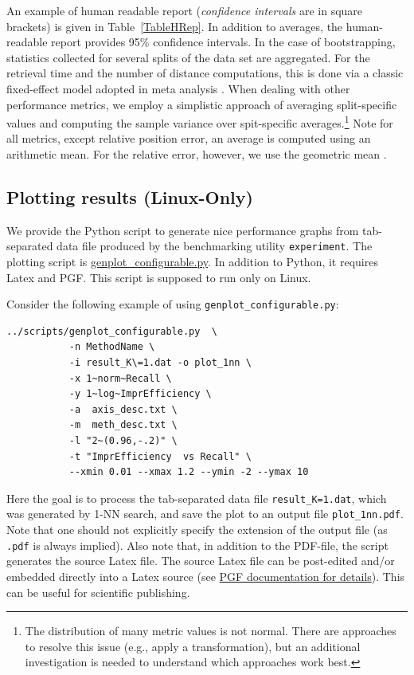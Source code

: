 \documentclass[runningheads,a4paper]{llncs}
\newcommand{\replocfile}{https://github.com/searchivarius/NonMetricSpaceLib/blob/pserv/}
\newcommand{\ttt}[1]{\texttt{#1}}
\begin{document}
{An example of human readable report (\emph{confidence intervals} are in square brackets)
is given in Table~\ref{TableHRep}.
In addition to averages, the human-readable report provides 95\% confidence intervals.
In the case of bootstrapping, statistics collected for several splits of the data set are aggregated.
For the retrieval time and the number of distance computations,
this is done via a classic fixed-effect model adopted in meta analysis \cite{Hedges_and_Vevea:1998}.
When dealing with other performance metrics, 
we employ a simplistic approach of averaging split-specific values
and computing the sample variance over spit-specific averages.\footnote{The distribution
of many metric values is not normal. There are approaches to resolve this issue (e.g., apply a transformation),
but an additional investigation is needed to understand which approaches work best.}
Note for all metrics, except relative position error, an average is computed using an arithmetic mean.
For the relative error, however, we use the geometric mean  \cite{king:1986}.


\subsection{Plotting results (Linux-Only)}\label{SectionGenPlot}
We provide the Python script to generate nice performance graphs 
from tab-separated data file produced by the 
benchmarking utility \ttt{experiment}. 
The plotting script is \href{\replocfile scripts/genplot_configurable.py}{genplot\_configurable.py}.
In addition to Python, it requires Latex and PGF. 
This script is supposed to run only on Linux.

Consider the following example of using \ttt{genplot\_configurable.py}:
\begin{verbatim}
../scripts/genplot_configurable.py  \
           -n MethodName \
           -i result_K\=1.dat -o plot_1nn \
           -x 1~norm~Recall \
           -y 1~log~ImprEfficiency \
           -a  axis_desc.txt \
           -m  meth_desc.txt \
           -l "2~(0.96,-.2)" \
           -t "ImprEfficiency  vs Recall" \
           --xmin 0.01 --xmax 1.2 --ymin -2 --ymax 10
\end{verbatim}
Here the goal is to process the tab-separated data file \ttt{result\_K=1.dat},
which was generated by 1-NN search, and save the plot to an output file \ttt{plot\_1nn.pdf}.
Note that one should not explicitly specify the extension of the output file (as
\ttt{.pdf} is always implied). Also note that, in addition to the PDF-file,
the script generates the source Latex file. 
The source Latex file can be post-edited and/or embedded directly into a Latex source 
(see \href{http://ftp.fau.de/ctan/graphics/pgf/base/doc/pgfmanual.pdf}{PGF documentation for details}).
This can be useful for scientific publishing.


}
\end{document}
